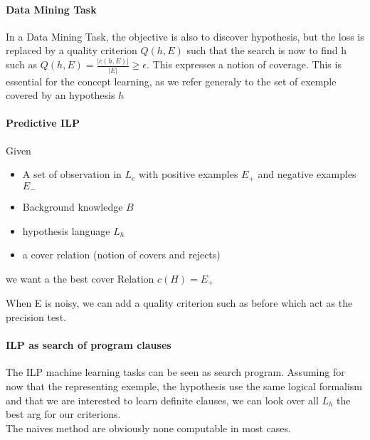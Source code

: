 		\paragraph*{Data Mining Task}
			 In a Data Mining Task, the objective is also to discover hypothesis, but the loss is replaced by a quality criterion $Q(h, E)$ such that the search is now to find {h} such as $Q(h, E) = \frac{|c(h, E)|}{|E|} \geq \epsilon$. This expresses a notion of coverage. This is essential for the concept learning, as we refer generaly to the set of exemple covered by an hypothesis $h$

		\paragraph{Predictive ILP}

			Given 
			\begin{itemize}
				\item A set of observation in $L_e$ with positive examples $E_+$ and negative examples $E_-$ 
				\item Background knowledge $B$
				\item hypothesis language $L_h$
				\item a cover relation (notion of covers and rejects)
			\end{itemize}
				we want a the best cover Relation $c(H)=E_+$

			When E is noisy, we can add a quality criterion such as before which act as the precision test. 

		\paragraph{ILP as search of program clauses}

			The ILP machine learning tasks can be seen as search program. Assuming for now that the representing exemple, the hypothesis use the same logical formalism and that we are interested to learn definite clauses, we can look over all $L_h$ the best arg for our criterions.\\
			The naives method are obviously none computable in most cases. 
